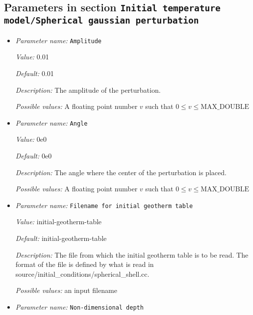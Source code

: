 \subsection{Parameters in section \tt Initial temperature model/Spherical gaussian perturbation}
\label{parameters:Initial_20temperature_20model/Spherical_20gaussian_20perturbation}

\begin{itemize}
\item {\it Parameter name:} {\tt Amplitude}
\label{parameters:Initial temperature model/Spherical gaussian perturbation/Amplitude}


{\it Value:} 0.01


{\it Default:} 0.01


{\it Description:} The amplitude of the perturbation.


{\it Possible values:} A floating point number $v$ such that $0 \leq v \leq \text{MAX\_DOUBLE}$
\item {\it Parameter name:} {\tt Angle}
\label{parameters:Initial temperature model/Spherical gaussian perturbation/Angle}


{\it Value:} 0e0


{\it Default:} 0e0


{\it Description:} The angle where the center of the perturbation is placed.


{\it Possible values:} A floating point number $v$ such that $0 \leq v \leq \text{MAX\_DOUBLE}$
\item {\it Parameter name:} {\tt Filename for initial geotherm table}
\label{parameters:Initial temperature model/Spherical gaussian perturbation/Filename for initial geotherm table}


{\it Value:} initial-geotherm-table


{\it Default:} initial-geotherm-table


{\it Description:} The file from which the initial geotherm table is to be read. The format of the file is defined by what is read in source/initial\_conditions/spherical\_shell.cc.


{\it Possible values:} an input filename
\item {\it Parameter name:} {\tt Non-dimensional depth}
\label{parameters:Initial temperature model/Spherical gaussian perturbation/Non-dimensional depth}



\end{itemize}
